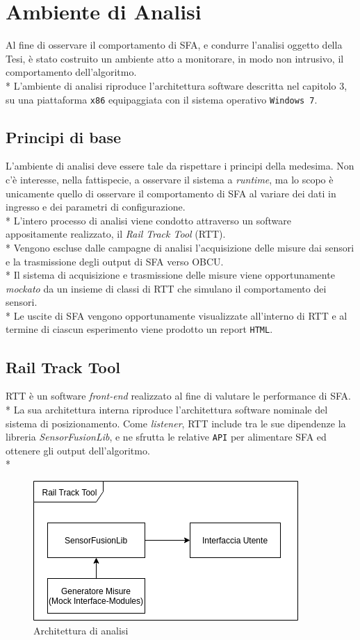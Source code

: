 \chapter{Ambiente di Analisi}
Al fine di osservare il comportamento di SFA, e condurre l'analisi oggetto della Tesi, \`e stato costruito un ambiente atto a monitorare, in modo non intrusivo, il comportamento dell'algoritmo. \cite{monitoring}\\*
L'ambiente di analisi riproduce l'architettura software descritta nel capitolo 3, su una piattaforma \texttt{x86} equipaggiata con il sistema operativo \texttt{Windows 7}. 
\section{Principi di base}
L'ambiente di analisi deve essere tale da rispettare i principi della medesima. Non c'\`e interesse, nella fattispecie, a osservare il sistema a \emph{runtime}, ma lo scopo \`e unicamente quello di osservare il comportamento di SFA al variare dei dati in ingresso e dei parametri di configurazione.\\*
L'intero processo di analisi viene condotto attraverso un software appositamente realizzato, il \emph{Rail Track Tool} (RTT).\\*
Vengono escluse dalle campagne di analisi l'acquisizione delle misure dai sensori e la trasmissione degli output di SFA verso OBCU.\\*
Il sistema di acquisizione e trasmissione delle misure viene opportunamente \emph{mockato} \cite{mocking} da un insieme di classi di RTT che simulano il comportamento dei sensori.\\*
Le uscite di SFA vengono opportunamente visualizzate all'interno di RTT e al termine di ciascun esperimento viene prodotto un report \texttt{HTML}.
\section{Rail Track Tool}
RTT \`e un software \emph{front-end} realizzato al fine di valutare le performance di SFA.\\*
La sua architettura interna riproduce l'architettura software nominale del sistema di posizionamento.
Come \emph{listener}, RTT include tra le sue dipendenze la libreria \emph{SensorFusionLib}, e ne sfrutta le relative \texttt{API} per alimentare SFA ed ottenere gli output dell'algoritmo.\\*
\begin{figure}[h]
	\centering
	\includegraphics[width=0.7\linewidth]{img/RTTSchemaEasy}
	\caption{Architettura di analisi}
	\label{fig:rtteasy}
\end{figure}
